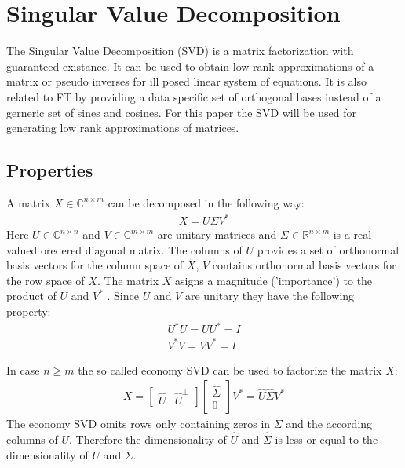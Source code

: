 \section{Singular Value Decomposition}
The Singular Value Decomposition (SVD) is a matrix factorization with guaranteed existance.
It can be used to obtain low rank approximations of a matrix or pseudo inverses for ill posed linear system of equations.
It is also related to FT by providing a data specific set of orthogonal bases instead of a gerneric set of sines and cosines. For this paper the SVD will be used for generating low rank approximations of matrices.
\cite{brunton_kutz_2019}
\subsection{Properties}
A matrix \(X \in \mathbb{C}^{n \times m}\) can be decomposed in the following way:
\begin{gather}
X = U \Sigma V^{*}
\end{gather}
Here \(U \in \mathbb{C}^{n \times n}\) and \(V \in \mathbb{C}^{m \times m}\) are unitary matrices and \(\Sigma \in \mathbb{R}^{n \times m}\) is a real valued oredered diagonal matrix.
The columns of \(U\) provides a set of orthonormal basis vectors for the column space of \(X\), \(V\) contains orthonormal basis vectors for the row space of \(X\). The matrix \(X\) asigns a magnitude ('importance') to the product of \(U\) and \(V^{*}\)  \cite{brunton_kutz_2019}.
Since \(U\) and \(V\) are unitary they have the following property:
\begin{gather}
U^{*}U = UU^{*} = I \\
V^{*}V = VV^{*} = I
\end{gather}
\cite{SZABO2015385}


In case \(n \geq m\) the so called economy SVD can be used to factorize the matrix \(X\):
\begin{gather}
X = \begin{bmatrix}
\hat{U} & \hat{U}^{\bot}
\end{bmatrix} 
\begin{bmatrix}
\hat{\Sigma} \\
0
\end{bmatrix}
V^{*} = \hat{U} \hat{\Sigma} V^{*}
\end{gather} 
The economy SVD omits rows only containing zeros in \(\Sigma\) and the according columns of \(U\).
Therefore the dimensionality of \(\hat{U}\) and \(\hat{\Sigma}\) is less or equal to the dimensionality of \(U\) and \(\Sigma\).
 \cite{brunton_kutz_2019}

